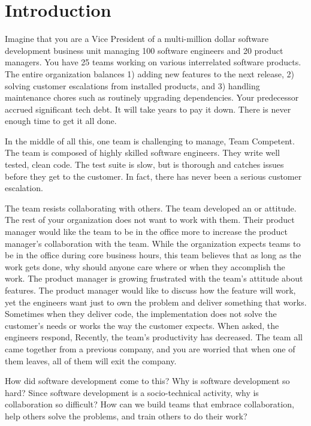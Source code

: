 

\chapter{Introduction}
\label{IntroductionChapter}


Imagine that you are a Vice President of a multi-million dollar software development business unit managing 100 software engineers and 20 product managers. You have 25 teams working on various interrelated software products. The entire organization balances 1) adding new features to the next release, 2) solving customer escalations from installed products, and 3) handling maintenance chores such as routinely upgrading dependencies. Your predecessor accrued significant tech debt. It will take years to pay it down. There is never enough time to get it all done. 


In the middle of all this, one team is challenging to manage, Team Competent. The team is composed of highly skilled software engineers. They write well tested, clean code. The test suite is slow, but is thorough and catches issues before they get to the customer. In fact, there has never been a serious customer escalation.


The team resists collaborating with others. The team developed an  or  attitude. The rest of your organization does not want to work with them. Their product manager would like the team to be in the office more to increase the product manager's collaboration with the team. While the organization expects teams to be in the office during core business hours, this team believes that as long as the work gets done, why should anyone care where or when they accomplish the work. The product manager is growing frustrated with the team's attitude about features. The product manager would like to discuss how the feature will work, yet the engineers want  just to own the problem and deliver something that works. Sometimes when they deliver code, the implementation does not solve the customer's needs or works the way the customer expects. When asked,  the engineers respond,  Recently, the team's productivity has decreased. The team all came together from a previous company, and you are worried that when one of them leaves, all of them will exit the company.


How did software development come to this? Why is software development so hard? Since software development is a socio-technical activity, why is collaboration so difficult?  How can we build teams that embrace collaboration, help others solve the problems, and train others to do their work?


